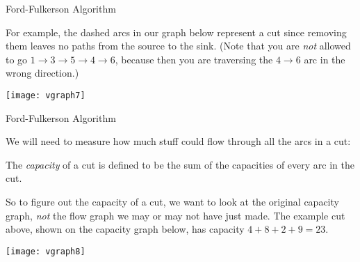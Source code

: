 \begin{frame}[fragile]{Ford-Fulkerson Algorithm}

For example, the dashed arcs in our graph below represent a cut since removing them leaves no paths from the source to the sink.  (Note that you are {\it not\/} allowed to go $1\rightarrow 3\rightarrow5\rightarrow4\rightarrow6$, because then you are traversing the $4\rightarrow 6$ arc in the wrong direction.)

\begin{center}
\texttt{[image: vgraph7]}
\end{center}


\end{frame}
\begin{frame}[fragile]{Ford-Fulkerson Algorithm}

We will need to measure how much stuff could flow through all the arcs in a cut:

\begin{definition}
The {\it capacity\/} of a cut is defined to be the sum of the capacities of every arc in the cut.
\end{definition}

So to figure out the capacity of a cut, we want to look at the original capacity graph, {\it not\/} the flow graph we may or may not have just made.  The example cut above, shown on the capacity graph below, has capacity $4+8+2+9=23$.

\begin{center}
\texttt{[image: vgraph8]}
\end{center}


\end{frame}
